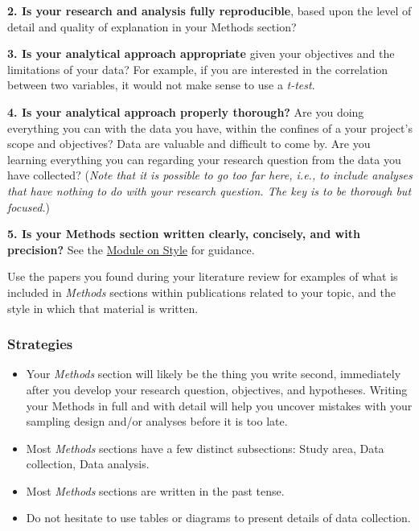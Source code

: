 \documentclass[
]{book}
\begin{document}
\textbf{2. Is your research and analysis fully reproducible}, based upon the level of detail and quality of explanation in your Methods section?

\textbf{3. Is your analytical approach appropriate} given your objectives and the limitations of your data? For example, if you are interested in the correlation between two variables, it would not make sense to use a \emph{t-test}.

\textbf{4. Is your analytical approach properly thorough?} Are you doing everything you can with the data you have, within the confines of a your project's scope and objectives? Data are valuable and difficult to come by. Are you learning everything you can regarding your research question from the data you have collected? (\emph{Note that it is possible to go too far here, i.e., to include analyses that have nothing to do with your research question. The key is to be thorough but focused.})

\textbf{5. Is your Methods section written clearly, concisely, and with precision?} See the \protect\hyperlink{style}{Module on Style} for guidance.

Use the papers you found during your literature review for examples of what is included in \emph{Methods} sections within publications related to your topic, and the style in which that material is written.

\hypertarget{strategies-2}{%
\subsubsection*{Strategies}\label{strategies-2}}

\begin{itemize}
\item
  Your \emph{Methods} section will likely be the thing you write second, immediately after you develop your research question, objectives, and hypotheses. Writing your Methods in full and with detail will help you uncover mistakes with your sampling design and/or analyses before it is too late.
\item
  Most \emph{Methods} sections have a few distinct subsections: Study area, Data collection, Data analysis.
\item
  Most \emph{Methods} sections are written in the past tense.
\item
  Do not hesitate to use tables or diagrams to present details of data collection.
\end{itemize}
\end{document}
